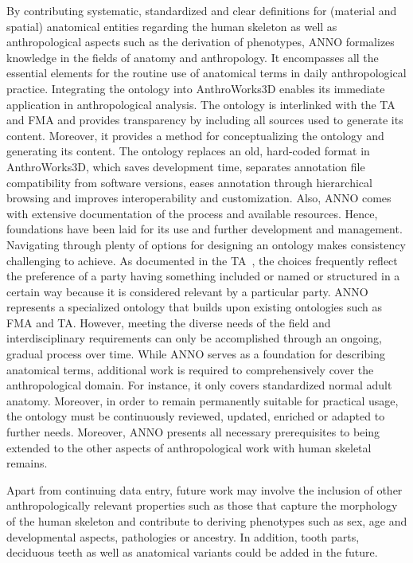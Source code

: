 \documentclass[sw]{iosart2x}
\newcommand{\aw}{AnthroWorks3D}
\begin{document}
By contributing systematic, standardized and clear definitions for (material and spatial) anatomical entities regarding the human skeleton as well as anthropological aspects such as the derivation of phenotypes, ANNO formalizes knowledge in the fields of anatomy and anthropology.
It encompasses all the essential elements for the routine use of anatomical terms in daily anthropological practice.
Integrating the ontology into \aw{} enables its immediate application in anthropological analysis.
%
The ontology is interlinked with the TA and FMA and provides transparency by including all sources used to generate its content.
Moreover, it provides a method for conceptualizing the ontology and generating its content.
The ontology replaces an old, hard-coded format in \aw{}, which saves development time, separates annotation file compatibility from software versions, eases annotation through hierarchical browsing and improves interoperability and customization.
Also, ANNO comes with extensive documentation of the process and available resources.
Hence, foundations have been laid for its use and further development and management.
%
Navigating through plenty of options for designing an ontology makes consistency challenging to achieve.
As documented in the TA~\citep[part II]{ta2}, the choices frequently reflect the preference of a party having something included or named or structured in a certain way because it is considered relevant by a particular party.
ANNO represents a specialized ontology that builds upon existing ontologies such as FMA and TA.
However, meeting the diverse needs of the field and interdisciplinary requirements can only be accomplished through an ongoing, gradual process over time.
%
While ANNO serves as a foundation for describing anatomical terms, additional work is required to comprehensively cover the anthropological domain.
For instance, it only covers standardized normal adult anatomy.
Moreover, in order to remain permanently suitable for practical usage, the ontology must be continuously reviewed, updated, enriched or adapted to further needs.
Moreover, ANNO presents all necessary prerequisites to being extended to the other aspects of anthropological work with human skeletal remains.

Apart from continuing data entry, future work may involve the inclusion of other anthropologically relevant properties such as those that capture the morphology of the human skeleton and contribute to deriving phenotypes such as sex, age and developmental aspects, pathologies or ancestry.
In addition, tooth parts, deciduous teeth as well as anatomical variants could be added in the future.
\end{document}
